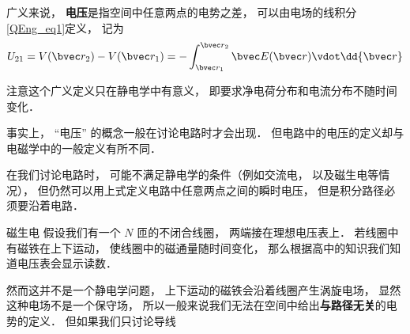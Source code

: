 

广义来说， \textbf{电压}是指空间中任意两点的电势之差， 可以由电场的线积分\autoref{QEng_eq1}定义， 记为
\begin{equation}
U_{21} = V(\bvec r_2) - V(\bvec r_1) = - \int_{\bvec r_1}^{\bvec r_2} \bvec E(\bvec r) \vdot \dd{\bvec r}
\end{equation}

注意这个广义定义只在静电学中有意义， 即要求净电荷分布和电流分布不随时间变化．

事实上， “电压” 的概念一般在讨论电路时才会出现． 但电路中的电压的定义却与电磁学中的一般定义有所不同．

在我们讨论电路时， 可能不满足静电学的条件（例如交流电， 以及磁生电等情况）， 但仍然可以用上式定义电路中任意两点之间的瞬时电压， 但是积分路径必须要沿着电路．

\begin{exercise}{磁生电}
假设我们有一个 $N$ 匝的不闭合线圈， 两端接在理想电压表上． 若线圈中有磁铁在上下运动， 使线圈中的磁通量随时间变化， 那么根据高中的知识我们知道电压表会显示读数．

然而这并不是一个静电学问题， 上下运动的磁铁会沿着线圈产生涡旋电场， 显然这种电场不是一个保守场， 所以一般来说我们无法在空间中给出\textbf{与路径无关}的电势的定义． 但如果我们只讨论导线
\end{exercise}